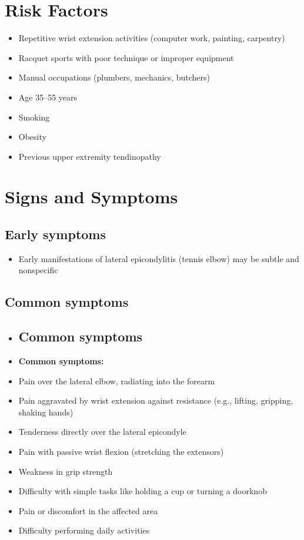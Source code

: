 \section{Risk Factors}

\begin{itemize}[noitemsep]
  \item Repetitive wrist extension activities (computer work, painting, carpentry)
  \item Racquet sports with poor technique or improper equipment
  \item Manual occupations (plumbers, mechanics, butchers)
  \item Age 35--55 years
  \item Smoking
  \item Obesity
  \item Previous upper extremity tendinopathy
\end{itemize}

\section{Signs and Symptoms}

\subsection{Early symptoms}
\begin{itemize}[noitemsep]
  \item Early manifestations of lateral epicondylitis (tennis elbow) may be subtle and nonspecific
\end{itemize}

\subsection{Common symptoms}
\begin{itemize}[noitemsep]
  \item \subsection{Common symptoms}
  \item \textbf{Common symptoms:}
  \item Pain over the lateral elbow, radiating into the forearm
  \item Pain aggravated by wrist extension against resistance (e.g., lifting, gripping, shaking hands)
  \item Tenderness directly over the lateral epicondyle
  \item Pain with passive wrist flexion (stretching the extensors)
  \item Weakness in grip strength
  \item Difficulty with simple tasks like holding a cup or turning a doorknob
  \item Pain or discomfort in the affected area
  \item Difficulty performing daily activities
\end{itemize}


